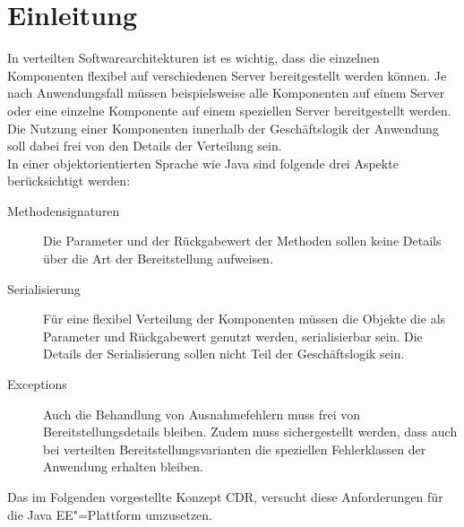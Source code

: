 \section{Einleitung\label{sec:introduction}}
In verteilten Softwarearchitekturen ist es wichtig, dass die einzelnen Komponenten flexibel auf verschiedenen Server bereitgestellt werden können. 
Je nach Anwendungsfall müssen beispielsweise alle Komponenten auf einem Server oder eine einzelne Komponente auf einem speziellen Server bereitgestellt werden. 
Die Nutzung einer Komponenten innerhalb der Geschäftslogik der Anwendung soll dabei frei von den Details der Verteilung sein.\\
In einer objektorientierten Sprache wie Java sind folgende drei Aspekte berücksichtigt werden:
\begin{description}
\item[Methodensignaturen] Die Parameter und der Rückgabewert der Methoden sollen keine Details über die Art der Bereitstellung aufweisen.
\item[Serialisierung] Für eine flexibel Verteilung der Komponenten müssen die Objekte die als Parameter und Rückgabewert genutzt werden, serialisierbar sein. Die Details der Serialisierung sollen nicht Teil der Geschäftslogik sein. 
\item[Exceptions] Auch die Behandlung von Ausnahmefehlern muss frei von Bereitstellungsdetails bleiben. Zudem muss sichergestellt werden, dass auch bei verteilten Bereitstellungsvarianten die speziellen Fehlerklassen der Anwendung erhalten bleiben.    
\end{description}
Das im Folgenden vorgestellte Konzept \ac{CDR}, versucht diese Anforderungen für die \ac{Java EE}"=Plattform umzusetzen.